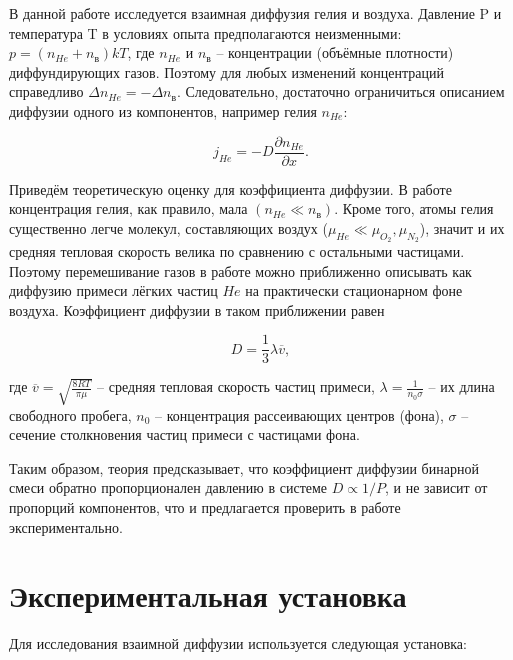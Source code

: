 \documentclass[a4paper,12pt]{article}
\theoremstyle{definition}
\begin{document}
		В данной работе исследуется взаимная диффузия гелия и воздуха. Давление P и температура T в условиях опыта предполагаются неизменными: $ p=(n_{He}+n_{\text{в}})kT $, где $ n_{He} $ и $ n_{\text{в}} $ -- концентрации (объёмные плотности) диффундирующих газов. Поэтому для любых изменений концентраций справедливо $ \Delta n_{He}=-\Delta n_{\text{в}} $. Следовательно, достаточно ограничиться описанием диффузии одного из компонентов, например гелия $ n_{He} $:
		
		\begin{equation}\label{1}
				j_{He}=-D\dfrac{\partial 	n_{He}}{\partial x}.
		\end{equation}
		
		Приведём теоретическую оценку для коэффициента диффузии. В работе концентрация гелия, как правило, мала $ (n_{He} \ll n_\text{в}) $. Кроме того, атомы гелия существенно легче молекул, составляющих воздух ($ \mu_{He} \ll \mu_{O_2}, \mu_{N_2} $), значит и их средняя тепловая скорость велика по сравнению с остальными частицами. Поэтому перемешивание газов в работе можно приближенно описывать как диффузию примеси лёгких частиц $ He $ на практически стационарном фоне воздуха. Коэффициент диффузии в таком приближении равен
		
		\begin{equation}\label{2}
			D=\dfrac{1}{3}\lambda 	\overline{v},
		\end{equation}
		
		где $ \overline{v}=\sqrt{\frac{8RT}{\pi \mu}} $ -- средняя тепловая скорость частиц примеси, $ \lambda = \frac{1}{n_0\sigma} $ -- их длина свободного пробега, $ n_0 $ -- концентрация рассеивающих центров (фона), $ \sigma $ -- сечение столкновения частиц примеси с частицами фона.
		
		Таким образом, теория предсказывает, что коэффициент диффузии бинарной смеси обратно пропорционален давлению в системе $ D \propto 1/P $, и не зависит от пропорций компонентов, что и предлагается проверить в работе экспериментально.
		
	\section{Экспериментальная установка}
	
		Для исследования взаимной диффузии используется следующая установка:
		
\end{document}
